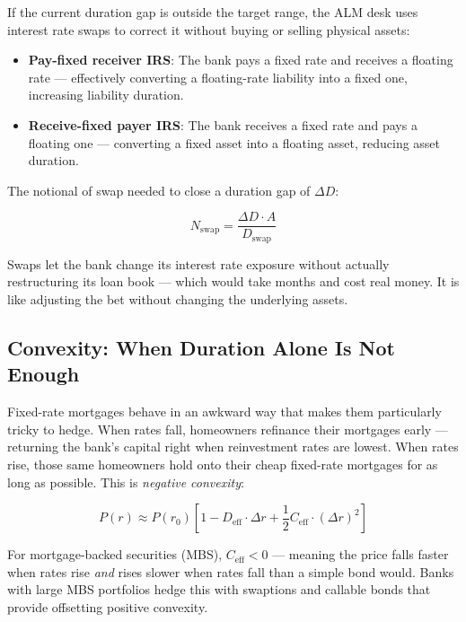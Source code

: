 \documentclass[12pt,a4paper]{article}
\begin{document}
If the current duration gap is outside the target range, the ALM desk uses
interest rate swaps to correct it without buying or selling physical assets:

\begin{itemize}[noitemsep]
  \item \textbf{Pay-fixed receiver IRS}: The bank pays a fixed rate and
        receives a floating rate --- effectively converting a floating-rate
        liability into a fixed one, increasing liability duration.
  \item \textbf{Receive-fixed payer IRS}: The bank receives a fixed rate
        and pays a floating one --- converting a fixed asset into a
        floating asset, reducing asset duration.
\end{itemize}

The notional of swap needed to close a duration gap of $\Delta D$:

\begin{equation}
  N_{\text{swap}} = \frac{\Delta D \cdot A}{D_{\text{swap}}}
\end{equation}

\begin{mdframed}[style=plainenglish]
Swaps let the bank change its interest rate exposure without actually
restructuring its loan book --- which would take months and cost real money.
It is like adjusting the bet without changing the underlying assets.
\end{mdframed}

\subsection{Convexity: When Duration Alone Is Not Enough}

Fixed-rate mortgages behave in an awkward way that makes them particularly
tricky to hedge.  When rates fall, homeowners refinance their mortgages early
--- returning the bank's capital right when reinvestment rates are lowest.
When rates rise, those same homeowners hold onto their cheap fixed-rate
mortgages for as long as possible.  This is \emph{negative convexity}:

\begin{equation}
  P(r) \approx P(r_0) \left[ 1 - D_{\text{eff}} \cdot \Delta r
    + \frac{1}{2} C_{\text{eff}} \cdot (\Delta r)^2 \right]
\end{equation}

For mortgage-backed securities (MBS), $C_{\text{eff}} < 0$ --- meaning the
price falls faster when rates rise \emph{and} rises slower when rates fall
than a simple bond would.  Banks with large MBS portfolios hedge this with
swaptions and callable bonds that provide offsetting positive convexity.
\end{document}
